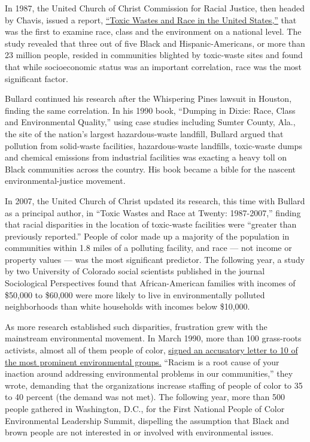 In 1987, the United Church of Christ Commission for Racial Justice, then
headed by Chavis, issued a report,
\href{http://d3n8a8pro7vhmx.cloudfront.net/unitedchurchofchrist/legacy_url/13567/toxwrace87.pdf}{``Toxic
Wastes and Race in the United States,''} that was the first to examine
race, class and the environment on a national level. The study revealed
that three out of five Black and Hispanic-Americans, or more than 23
million people, resided in communities blighted by toxic-waste sites and
found that while socioeconomic status was an important correlation, race
was the most significant factor.

Bullard continued his research after the Whispering Pines lawsuit in
Houston, finding the same correlation. In his 1990 book, ``Dumping in
Dixie: Race, Class and Environmental Quality,'' using case studies
including Sumter County, Ala., the site of the nation's largest
hazardous-waste landfill, Bullard argued that pollution from solid-waste
facilities, hazardous-waste landfills, toxic-waste dumps and chemical
emissions from industrial facilities was exacting a heavy toll on Black
communities across the country. His book became a bible for the nascent
environmental-justice movement.

In 2007, the United Church of Christ updated its research, this time
with Bullard as a principal author, in ``Toxic Wastes and Race at
Twenty: 1987-2007,'' finding that racial disparities in the location of
toxic-waste facilities were ``greater than previously reported.'' People
of color made up a majority of the population in communities within 1.8
miles of a polluting facility, and race --- not income or property
values --- was the most significant predictor. The following year, a
study by two University of Colorado social scientists published in the
journal Sociological Perspectives found that African-American families
with incomes of \$50,000 to \$60,000 were more likely to live in
environmentally polluted neighborhoods than white households with
incomes below \$10,000.

As more research established such disparities, frustration grew with the
mainstream environmental movement. In March 1990, more than 100
grass-roots activists, almost all of them people of color,
\href{https://www.ejnet.org/ej/swop.pdf}{signed an accusatory letter to
10 of the most prominent environmental groups.} ``Racism is a root cause
of your inaction around addressing environmental problems in our
communities,'' they wrote, demanding that the organizations increase
staffing of people of color to 35 to 40 percent (the demand was not
met). The following year, more than 500 people gathered in Washington,
D.C., for the First National People of Color Environmental Leadership
Summit, dispelling the assumption that Black and brown people are not
interested in or involved with environmental issues.

